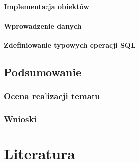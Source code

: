 \documentclass[polish, 11pt]{article}
\begin{document}
		    \paragraph{Implementacja obiektów}
		    
		    \paragraph{Wprowadzenie danych}
		    
		    \paragraph{Zdefiniowanie typowych operacji SQL}

    \subsection{Podsumowanie}
	    \subsubsection{Ocena realizacji tematu}
	    
		\subsubsection{Wnioski}

\section{Literatura}
\end{document}

